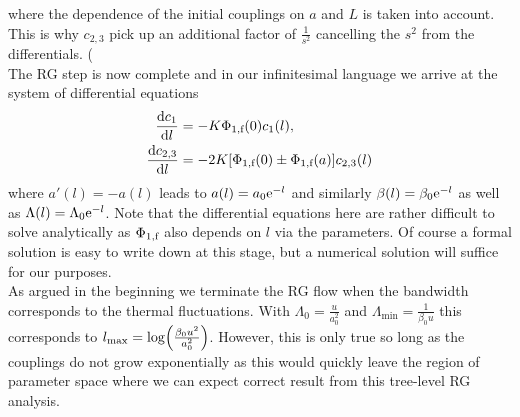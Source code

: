 \documentclass[english, parskip=full]{scrartcl}
\begin{document}
where the dependence of the initial couplings on $a$ and $L$ is taken into account.
This is why $c_{2,3}$ pick up an additional factor of $\frac{1}{s^2}$ cancelling the $s^2$ from the differentials. (\\
The RG step is now complete and in our infinitesimal language we arrive at the system of differential equations
\begin{align}
\frac{\text{d} c_1}{\text{d} l} &= - K\Phi_{1,\text{f}}(0) c_1(l),\\
\frac{\text{d} c_{2,3}}{\text{d} l} &= - 2K [\Phi_{1,\text{f}}(0) \pm \Phi_{1,\text{f}}(a)] c_{2,3}(l)
\end{align}
where $a'(l)=-a(l)$ leads to $a(l) = a_0 \text{e}^{-l}$ and similarly $\beta(l) = \beta_0 \text{e}^{-l}$ as well as $\Lambda(l) = \Lambda_0 \text{e}^{- l}$.
Note that the differential equations here are rather difficult to solve analytically as $\Phi_{1,\text{f}}$ also depends on $l$ via the parameters.
Of course a formal solution is easy to write down at this stage, but a numerical solution will suffice for our purposes.\\
As argued in the beginning we terminate the RG flow when the bandwidth corresponds to the thermal fluctuations.
With $\Lambda_0 = \frac{u}{a_0^2}$ and $\Lambda_\text{min} = \frac{1}{\beta_0 u}$ this corresponds to $l_\text{max} = \log\kla*{\frac{\beta_0 u^2}{a_0^2}}$.
However, this is only true so long as the couplings do not grow exponentially as this would quickly leave the region of parameter space where we can expect correct result from this tree-level RG analysis.
\end{document}
